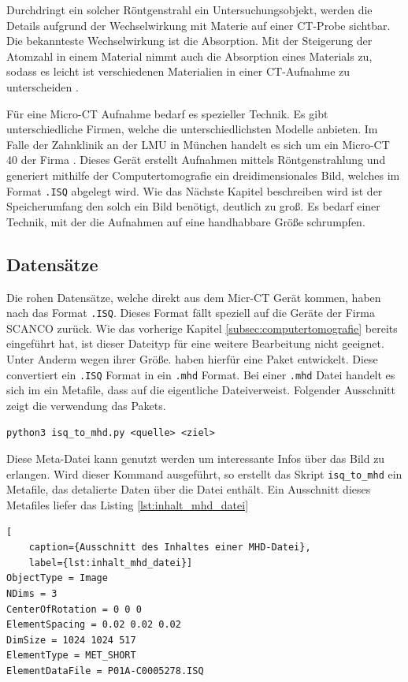 Durchdringt ein solcher Röntgenstrahl ein Untersuchungsobjekt, werden die Details
aufgrund der Wechselwirkung mit Materie auf einer CT-Probe sichtbar. Die
bekannteste Wechselwirkung ist die Absorption. Mit der Steigerung der Atomzahl in
einem Material nimmt auch die Absorption eines Materials zu, sodass es leicht
ist verschiedenen Materialien in einer CT-Aufnahme zu unterscheiden \citep{nib2024}.

Für eine Micro-CT Aufnahme bedarf es spezieller Technik. Es gibt
unterschiedliche Firmen, welche die unterschiedlichsten Modelle anbieten. Im
Falle der Zahnklinik an der LMU in München handelt es sich um ein Micro-CT 40
der Firma \citet{scanco2024}. Dieses Gerät erstellt Aufnahmen mittels
Röntgenstrahlung und generiert mithilfe der Computertomografie ein
dreidimensionales Bild, welches im Format \texttt{.ISQ} abgelegt wird. Wie das Nächste
Kapitel beschreiben wird ist der Speicherumfang den solch ein Bild benötigt,
deutlich zu groß. Es bedarf einer Technik, mit der die Aufnahmen auf eine
handhabbare Größe schrumpfen.

\subsection{Datensätze}
\label{subsec:datensätze} Die rohen Datensätze, welche direkt aus dem Micr-CT Gerät
kommen, haben nach \citet{scanco2024} das Format \texttt{.ISQ}. Dieses Format fällt
speziell auf die Geräte der Firma SCANCO zurück. Wie das vorherige Kapitel
\ref{subsec:computertomografie} bereits eingeführt hat, ist dieser Dateityp für eine
weitere Bearbeitung nicht geeignet. Unter Anderm wegen ihrer Größe. \citet{RoeschKunzelmann2018}
haben hierfür eine Paket entwickelt. Diese convertiert ein \texttt{.ISQ} Format
in ein \texttt{.mhd} Format. Bei einer \texttt{.mhd} Datei handelt es sich im ein
Metafile, dass auf die eigentliche Dateiverweist. Folgender Ausschnitt zeigt die
verwendung das Pakets.

\texttt{python3 isq\_to\_mhd.py <quelle> <ziel>}

Diese Meta-Datei kann genutzt werden um interessante Infos über das Bild zu erlangen.
Wird dieser Kommand ausgeführt, so erstellt das Skript \texttt{isq\_to\_mhd} ein
Metafile, das detalierte Daten über die Datei enthält. Ein Ausschnitt dieses
Metafiles liefer das Listing \ref{lst:inhalt_mhd_datei}

\begin{lstlisting}[
	caption={Ausschnitt des Inhaltes einer MHD-Datei},
	label={lst:inhalt_mhd_datei}]
ObjectType = Image
NDims = 3
CenterOfRotation = 0 0 0
ElementSpacing = 0.02 0.02 0.02
DimSize = 1024 1024 517
ElementType = MET_SHORT
ElementDataFile = P01A-C0005278.ISQ
\end{lstlisting}


